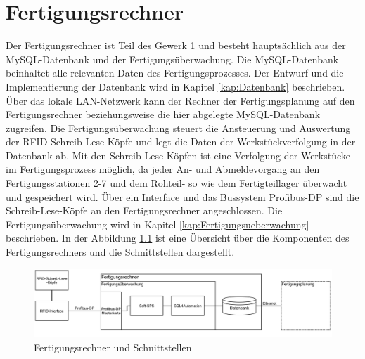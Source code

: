\chapter{Fertigungsrechner}\label{kap:Fertigungsrechner}
 Der Fertigungsrechner ist Teil des Gewerk 1 und besteht hauptsächlich aus der MySQL-Datenbank und der Fertigungsüberwachung. Die MySQL-Daten\-bank be\-in\-hal\-tet alle relevanten Daten des Fertigungsprozesses. Der Entwurf und die Implementierung der Datenbank wird in Kapitel \ref{kap:Datenbank} beschrieben. Über das lokale LAN-Netzwerk kann der Rechner der Fertigungsplanung auf den Fertigungsrechner beziehungsweise die hier abgelegte MySQL-Datenbank zugreifen. 
 Die Fertigungsüberwachung steuert die Ansteuerung und Auswertung der RFID-Schreib-Lese-Köpfe und legt die Daten der Werkstückverfolgung in der Datenbank ab. Mit den Schreib-Lese-Köpfen ist eine Verfolgung der Werkstücke im Fertigungsprozess möglich, da jeder An- und Abmeldevorgang an den Fertigungsstationen 2-7 und dem Rohteil- so wie dem Fertigteillager überwacht und gespeichert wird.  Über ein Interface und das Bussystem Profibus-DP sind die Schreib-Lese-Köpfe an den Fertigungsrechner angeschlossen. Die Fertigungsüberwachung wird in Kapitel \ref{kap:Fertigungsueberwachung} beschrieben.  In der Abbildung \ref{fig:Fertigungsrechner} ist eine Übersicht über die Komponenten des Fertigungsrechners und die Schnittstellen dargestellt.
 \begin{figure}[hbt]
	    \centering
	    \includegraphics[width=1\linewidth]{Bilder/Fertigungsrechner.png}
        \caption{Fertigungsrechner und Schnittstellen}
        \label{fig:Fertigungsrechner}
\end{figure}
 